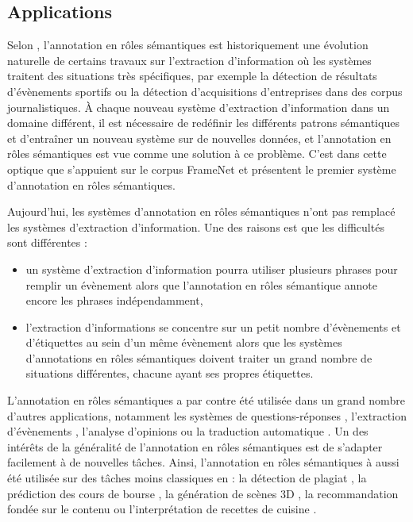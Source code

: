 \subsection{Applications}

Selon \cite{gildea2002automatic}, l'annotation en rôles sémantiques est
historiquement une évolution naturelle de certains travaux sur l'extraction
d'information où les systèmes traitent des situations très spécifiques, par
exemple la détection de résultats d'évènements sportifs ou la détection
d'acquisitions d'entreprises dans des corpus journalistiques. À chaque nouveau
système d'extraction d'information dans un domaine différent, il est nécessaire
de redéfinir les différents patrons sémantiques et d'entraîner un nouveau
système sur de nouvelles données, et l'annotation en rôles sémantiques est vue
comme une solution à ce problème. C'est dans cette optique que
\cite{gildea2002automatic} s'appuient sur le corpus FrameNet et présentent le
premier système d'annotation en rôles sémantiques.

Aujourd'hui, les systèmes d'annotation en rôles sémantiques n'ont pas remplacé
les systèmes d'extraction d'information. Une des raisons est que les
difficultés sont différentes \citep{boros2014etiquetage} :

\begin{itemize}
    \item un système d'extraction d'information pourra utiliser plusieurs
        phrases pour remplir un évènement alors que l'annotation en rôles
        sémantique annote encore les phrases indépendamment,
    \item l'extraction d'informations se concentre sur un petit nombre
        d'évènements et d'étiquettes au sein d'un même évènement alors que les
        systèmes d'annotations en rôles sémantiques doivent traiter un grand
        nombre de situations différentes, chacune ayant ses propres étiquettes.
\end{itemize}

L'annotation en rôles sémantiques a par contre été utilisée dans un grand
nombre d'autres applications, notamment les systèmes de questions-réponses
\citep{shen2007using}, l'extraction d'évènements \citep{exner2011using},
l'analyse d'opinions \citep{das2012structure} ou la traduction automatique
\citep{bazrafshan2013semantic,bazrafshan2014comparing}. Un des intérêts de la
généralité de l'annotation en rôles sémantiques est de s'adapter facilement à
de nouvelles tâches. Ainsi, l'annotation en rôles sémantiques à aussi été
utilisée sur des tâches moins classiques en : la détection de plagiat
\citep{osman2012improved}, la prédiction des cours de bourse
\citep{xie2013semantic}, la génération de scènes 3D \citep{chang2014learning},
la recommandation fondée sur le contenu \citep{de2014exploiting} ou
l'interprétation de recettes de cuisine \citep{malmaud2014cooking}.

